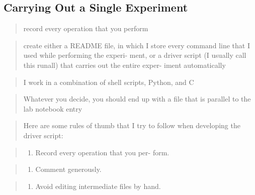 \documentclass[12pt,]{book}
\providecommand{\tightlist}{%
  \setlength{\itemsep}{0pt}\setlength{\parskip}{0pt}}
\begin{document}
\subsection{Carrying Out a Single
Experiment}\label{carrying-out-a-single-experiment}

\begin{quote}
record every operation that you perform
\end{quote}

\begin{quote}
create either a README file, in which I store every command line that I
used while performing the experi- ment, or a driver script (I usually
call this runall) that carries out the entire exper- iment automatically
\end{quote}

\begin{quote}
I work in a combination of shell scripts, Python, and C
\end{quote}

\begin{quote}
Whatever you decide, you should end up with a file that is parallel to
the lab notebook entry
\end{quote}

\begin{quote}
Here are some rules of thumb that I try to follow when developing the
driver script:
\end{quote}

\begin{quote}
\begin{enumerate}
\def\labelenumi{\arabic{enumi}.}
\tightlist
\item
  Record every operation that you per- form.
\end{enumerate}
\end{quote}

\begin{quote}
\begin{enumerate}
\def\labelenumi{\arabic{enumi}.}
\setcounter{enumi}{1}
\tightlist
\item
  Comment generously.
\end{enumerate}
\end{quote}

\begin{quote}
\begin{enumerate}
\def\labelenumi{\arabic{enumi}.}
\setcounter{enumi}{2}
\tightlist
\item
  Avoid editing intermediate files by hand.
\end{enumerate}
\end{quote}
\end{document}
